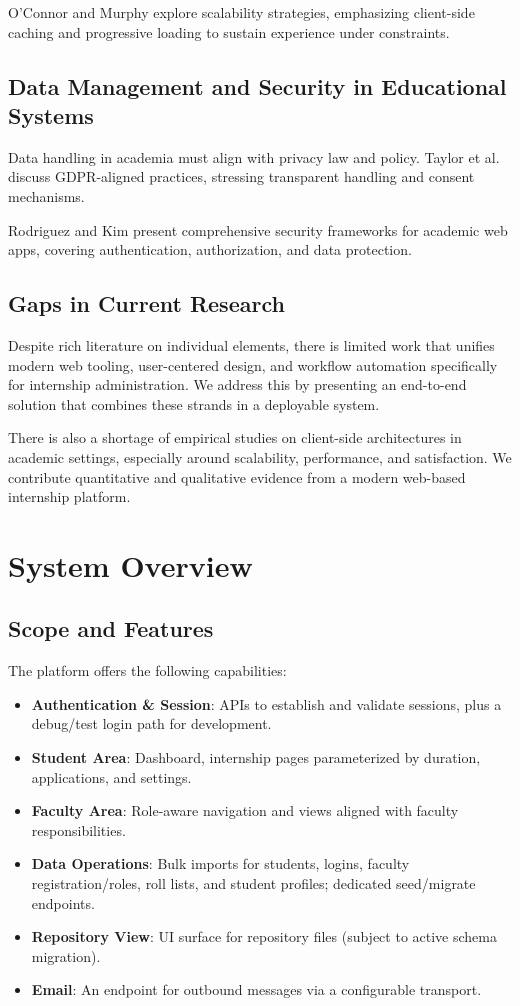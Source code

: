 \documentclass[conference]{IEEEtran}
\begin{document}
O'Connor and Murphy \cite{oconnor2023scalability} explore scalability strategies, emphasizing client-side caching and progressive loading to sustain experience under constraints.

\subsection{Data Management and Security in Educational Systems}
Data handling in academia must align with privacy law and policy. Taylor et al. \cite{taylor2023privacy} discuss GDPR-aligned practices, stressing transparent handling and consent mechanisms.

Rodriguez and Kim \cite{rodriguez2023security} present comprehensive security frameworks for academic web apps, covering authentication, authorization, and data protection.

\subsection{Gaps in Current Research}
Despite rich literature on individual elements, there is limited work that unifies modern web tooling, user-centered design, and workflow automation specifically for internship administration. We address this by presenting an end-to-end solution that combines these strands in a deployable system.

There is also a shortage of empirical studies on client-side architectures in academic settings, especially around scalability, performance, and satisfaction. We contribute quantitative and qualitative evidence from a modern web-based internship platform.

\section{System Overview}
\subsection{Scope and Features}
The platform offers the following capabilities:
\begin{itemize}[leftmargin=*,nosep]
  \item \textbf{Authentication \& Session}: APIs to establish and validate sessions, plus a debug/test login path for development.
  \item \textbf{Student Area}: Dashboard, internship pages parameterized by duration, applications, and settings.
  \item \textbf{Faculty Area}: Role-aware navigation and views aligned with faculty responsibilities.
  \item \textbf{Data Operations}: Bulk imports for students, logins, faculty registration/roles, roll lists, and student profiles; dedicated seed/migrate endpoints.
  \item \textbf{Repository View}: UI surface for repository files (subject to active schema migration).
  \item \textbf{Email}: An endpoint for outbound messages via a configurable transport.
\end{itemize}
\end{document}
